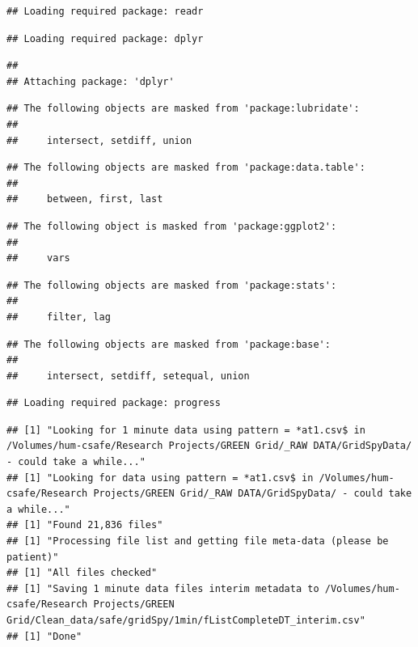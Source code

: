 \documentclass[]{article}
\begin{document}
\begin{verbatim}
## Loading required package: readr
\end{verbatim}

\begin{verbatim}
## Loading required package: dplyr
\end{verbatim}

\begin{verbatim}
## 
## Attaching package: 'dplyr'
\end{verbatim}

\begin{verbatim}
## The following objects are masked from 'package:lubridate':
## 
##     intersect, setdiff, union
\end{verbatim}

\begin{verbatim}
## The following objects are masked from 'package:data.table':
## 
##     between, first, last
\end{verbatim}

\begin{verbatim}
## The following object is masked from 'package:ggplot2':
## 
##     vars
\end{verbatim}

\begin{verbatim}
## The following objects are masked from 'package:stats':
## 
##     filter, lag
\end{verbatim}

\begin{verbatim}
## The following objects are masked from 'package:base':
## 
##     intersect, setdiff, setequal, union
\end{verbatim}

\begin{verbatim}
## Loading required package: progress
\end{verbatim}

\begin{verbatim}
## [1] "Looking for 1 minute data using pattern = *at1.csv$ in /Volumes/hum-csafe/Research Projects/GREEN Grid/_RAW DATA/GridSpyData/ - could take a while..."
## [1] "Looking for data using pattern = *at1.csv$ in /Volumes/hum-csafe/Research Projects/GREEN Grid/_RAW DATA/GridSpyData/ - could take a while..."
## [1] "Found 21,836 files"
## [1] "Processing file list and getting file meta-data (please be patient)"
## [1] "All files checked"
## [1] "Saving 1 minute data files interim metadata to /Volumes/hum-csafe/Research Projects/GREEN Grid/Clean_data/safe/gridSpy/1min/fListCompleteDT_interim.csv"
## [1] "Done"
\end{verbatim}
\end{document}

